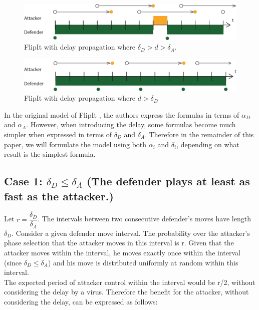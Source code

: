 \begin{figure}[hbtp]
\centering
\includegraphics[scale=0.7]{Images/FlipItCase1delay.pdf} 
\caption{FlipIt with delay propagation where $\delta_{D} > d > \delta_{A}$.   }
\label{langedelay}
\end{figure}

\begin{figure}[hbtp]
\centering
\includegraphics[scale=0.7]{Images/FlipItCase1delaytobig.pdf} 
\caption{FlipIt with delay propagation where $ d > \delta_{D}$ }
\label{langeredelay}
\end{figure}


In the original model of FlipIt \cite{FlipIt}, the authors express the formulas in terms of $\alpha_{D}$ and $\alpha_{A}$. However, when introducing the delay, some formulas become much simpler when expressed in terms of $\delta_{D}$ and $\delta_{A}$. Therefore in the remainder of this paper, we will formulate the model using both $\alpha_{i}$ and $\delta_{i}$, depending on what result is the simplest formula.

\subsection*{\textbf{Case 1:} $\delta_{D} \leq \delta_{A} $ (The defender plays at least as fast as the attacker.) }

Let $r = \dfrac{\delta_{D}}{ \delta_{A} }$. The intervals between two consecutive defender's moves have length $\delta_{D}$. Consider a given defender move interval. The probability over the attacker's phase selection that the attacker moves in this interval is r. Given that the attacker moves within the interval, he moves exactly once within the interval (since $\delta_{D} \leq \delta_{A} $) and his move is distributed uniformly at random within this interval. \\

The expected period of attacker control within the interval would be r/2, without considering the delay by a virus. Therefore the benefit for the attacker, without considering the delay, can be expressed as follows:


